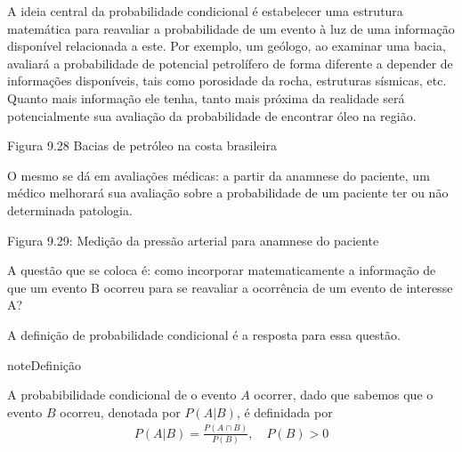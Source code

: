 A ideia central da probabilidade condicional é estabelecer uma estrutura matemática para reavaliar a probabilidade de um evento à luz de uma informação disponível relacionada a este. Por exemplo, um geólogo, ao examinar uma bacia, avaliará a probabilidade de potencial petrolífero de forma diferente a depender de informações disponíveis, tais como porosidade da rocha, estruturas sísmicas, etc. Quanto mais informação ele tenha, tanto mais próxima da realidade será potencialmente sua avaliação da probabilidade de encontrar óleo na região.
\label{\detokenize{PE511-7:fig-coloque-aqui-o-nome}}
\begin{figure}[H]
\centering

\noindent{}
\label{\detokenize{PE511-7:fig-coloque-aqui-o-nome}}\end{figure}

Figura 9.28 Bacias de petróleo na costa brasileira

O mesmo se dá em avaliações médicas: a partir da anamnese do paciente, um médico melhorará sua avaliação sobre a probabilidade de um paciente ter ou não determinada patologia.
\label{\detokenize{PE511-7:id1}}
\begin{figure}[H]
\centering

\noindent{}
\label{\detokenize{PE511-7:id1}}\end{figure}

Figura 9.29: Medição da pressão arterial para anamnese do paciente

A questão que se coloca é: como incorporar matematicamente a informação de que um evento B ocorreu para se reavaliar a ocorrência de um evento de interesse A?

A definição de probabilidade condicional é a resposta para essa questão.

\begin{sphinxadmonition}{note}{Definição}

A probabibilidade condicional de o evento \(A\) ocorrer, dado que sabemos que o evento \(B\)  ocorreu, denotada por \(P(A|B)\),  é definidada por
\begin{equation*}
\begin{split}P(A|B)=\frac{P(A\cap B)}{P(B)}, \quad P(B)>0\end{split}
\end{equation*}\end{sphinxadmonition}

